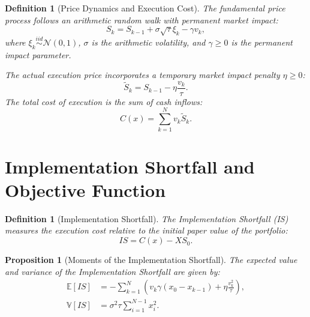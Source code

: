 \documentclass[11pt,a4paper]{article}
\newtheorem{proposition}[theorem]{Proposition}
\newtheorem{definition}[theorem]{Definition}
\begin{document}
\begin{definition}[Price Dynamics and Execution Cost]
The fundamental price process follows an arithmetic random walk with permanent market impact:
\[ S_k = S_{k-1} + \sigma \sqrt{\tau} \xi_k - \gamma v_k, \]
where $\xi_k \overset{iid}{\sim} \mathcal{N}(0, 1)$, $\sigma$ is the arithmetic volatility, and $\gamma \geq 0$ is the permanent impact parameter.

The actual execution price incorporates a temporary market impact penalty $\eta \geq 0$:
\[ \tilde{S}_k = S_{k-1} - \eta \frac{v_k}{\tau}. \]
The total cost of execution is the sum of cash inflows:
\begin{equation}
C(x) = \sum_{k=1}^{N} v_k \tilde{S}_k.
\end{equation}
\end{definition}

\section{Implementation Shortfall and Objective Function}

\begin{definition}[Implementation Shortfall]
The Implementation Shortfall (IS) measures the execution cost relative to the initial paper value of the portfolio:
\begin{equation}
IS = C(x) - X S_0.
\end{equation}
\end{definition}

\begin{proposition}[Moments of the Implementation Shortfall]
The expected value and variance of the Implementation Shortfall are given by:
\begin{align*}
\mathbb{E}[IS] &= - \sum_{k=1}^{N} \left( v_k \gamma (x_0 - x_{k-1}) + \eta \frac{v_k^2}{\tau} \right), \\
\mathbb{V}[IS] &= \sigma^2 \tau \sum_{i=1}^{N-1} x_i^2.
\end{align*}
\end{proposition}
\end{document}
